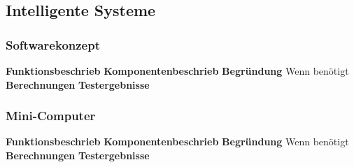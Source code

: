 \subsection{Intelligente Systeme}

\subsubsection{Softwarekonzept}
\textbf{Funktionsbeschrieb}
\textbf{Komponentenbeschrieb}
\textbf{Begründung}
Wenn benötigt
\textbf{Berechnungen}
\textbf{Testergebnisse}

\subsubsection{Mini-Computer}
\textbf{Funktionsbeschrieb}
\textbf{Komponentenbeschrieb}
\textbf{Begründung}
Wenn benötigt
\textbf{Berechnungen}
\textbf{Testergebnisse}

